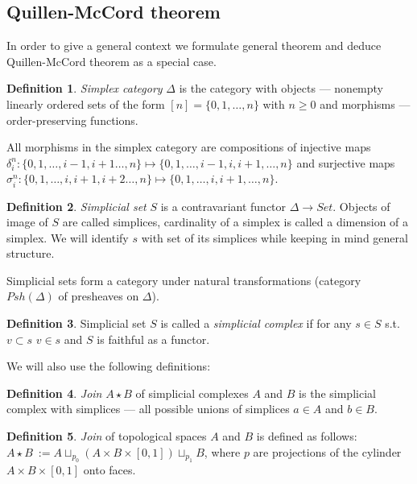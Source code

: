 \documentclass[a4paper, 12pt]{article}
\theoremstyle{definition}
\newtheorem{definition}{Definition}
\theoremstyle{remark}
\newcommand{\define}[1]{{\textit{#1}}}
\renewcommand{\geq}{\geqslant}
\begin{document}
\subsection{Quillen-McCord theorem}

In order to give a general context we formulate general theorem and deduce Quillen-McCord theorem as a special case.\\

\begin{definition}
  \define{Simplex category} $\Delta$ is the category with objects --- nonempty linearly ordered sets of the form $[n] = \{0,1,\ldots,n\}$ with $n \geq 0$ and morphisms --- order-preserving functions.
\end{definition}

All morphisms in the simplex category are compositions of injective maps $\delta_i^n : \{0,1,\ldots,i-1,i+1\ldots,n\} \mapsto \{0,1,\ldots,i-1,i,i+1,\ldots,n\}$ and surjective maps $\sigma^n_i : \{0,1,\ldots,i,i+1,i+2\ldots,n\} \mapsto \{0,1,\ldots,i,i+1,\ldots,n\}$.

\begin{definition}
  \define{Simplicial set} $S$ is a contravariant functor $\Delta \to Set$. Objects of image of $S$ are called simplices, cardinality of a simplex is called a dimension of a simplex. We will identify $s$ with set of its simplices while keeping in mind general structure.
\end{definition}

Simplicial sets form a category under natural transformations (category $Psh(\Delta)$ of presheaves on $\Delta$).\\

\begin{definition}
  Simplicial set $S$ is called a \define{simplicial complex} if for any $s \in S$ s.t. $v \subset s$  $v \in s$ and $S$ is faithful as a functor.
\end{definition}

We will also use the following definitions:

\begin{definition}
  \define{Join} $A \star B$ of simplicial complexes $A$ and $B$ is the simplicial complex with simplices --- all possible unions of simplices $a \in A$ and $b \in B$.
\end{definition}

\begin{definition}
  \define{Join} of topological spaces $A$ and $B$ is defined as follows: $A \star B\ := A \sqcup_{p_0} (A \times B \times [0,1]) \sqcup_{p_1} B$, where $p$ are projections of the cylinder $A \times B \times [0,1]$ onto faces.
\end{definition}
\end{document}
